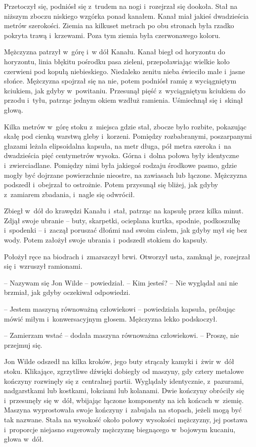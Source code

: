 \documentclass[oneside,polish,11pt,sfheadings]{mwbk}
\begin{document}
Przetoczył się, podniósł się z~trudem na nogi i~rozejrzał się dookoła.
Stał na niższym zboczu niskiego wzgórka ponad kanałem. Kanał miał jakieś
dwadzieścia metrów szerokości. Ziemia na kilkuset metrach po obu
stronach była rzadko pokryta trawą i~krzewami. Poza tym ziemia była
czerwonawego koloru.

Mężczyzna patrzył w~górę i~w dół Kanału. Kanał biegł od horyzontu do
horyzontu, linia błękitu pośrodku pasa zieleni, przepoławiając wielkie
koło czerwieni pod kopułą niebieskiego. Niedaleko zenitu nieba świeciło
małe i~jasne słońce. Mężczyzna spojrzał się na nie, potem podniósł ramię
z wyciągniętym kciukiem, jak gdyby w~powitaniu. Przesunął pięść z~wyciągniętym kciukiem do przodu i~tyłu, patrząc jednym okiem wzdłuż
ramienia. Uśmiechnął się i~skinął głową.

Kilka metrów w~górę stoku z~miejsca gdzie stał, zbocze było rozbite,
pokazując skałę pod cienką warstwą gleby i~korzeni. Pomiędzy
rozbabranymi, poszarpanymi głazami leżała elipsoidalna kapsuła, na metr
długa, pół metra szeroka i~na dwadzieścia pięć centymetrów wysoka. Górna
i~dolna połowa były identyczne i~zwierciadlane. Pomiędzy nimi była
jakiegoś rodzaju środkowe pasmo, gdzie mogły być dojrzane powierzchnie
nieostre, na zawiasach lub łączone. Mężczyzna podszedł i~obejrzał to
ostrożnie. Potem przysunął się bliżej, jak gdyby z~zamiarem zbadania, i~nagle się odwrócił.

Zbiegł w~dół do krawędzi Kanału i~stał, patrząc na kapsułę przez kilka
minut. Zdjął swoje ubranie -- buty, skarpetki, ocieplana kurtka, spodnie,
podkoszulkę i~spodenki -- i~zaczął poruszać dłońmi nad swoim ciałem, jak
gdyby mył się bez wody. Potem założył swoje ubrania i~podszedł stokiem
do kapsuły.

Położył ręce na biodrach i~zmarszczył brwi. Otworzył usta, zamknął je,
rozejrzał się i~wzruszył ramionami.

-- Nazywam się Jon Wilde -- powiedział. -- Kim jesteś? -- Nie wyglądał ani
nie brzmiał, jak gdyby oczekiwał odpowiedzi.

-- Jestem maszyną równoważną człowiekowi -- powiedziała kapsuła, próbując
mówić miłym i~konwersacyjnym głosem. Mężczyzna lekko podskoczył.

-- Zamierzam wstać -- dodała maszyna równoważna człowiekowi. -- Proszę, nie
przejmuj się.

Jon Wilde odszedł na kilka kroków, jego buty strącały kamyki i~żwir w~dół stoku. Klikające, zgrzytliwe dźwięki dobiegły od maszyny, gdy cztery
metalowe kończyny rozwinęły się z~centralnej partii. Wyglądały
identycznie, z~pazurami, nadgarstkami lub kostkami, łokciami lub
kolanami. Dwie kończyny obróciły się i~przesunęły się w~dół, wbijając
łączone komponenty na ich końcach w~ziemię. Maszyna wyprostowała swoje
kończyny i~zabujała na stopach, jeżeli mogą być tak nazwane. Stała na
wysokość około połowy wysokości mężczyzny, jej postawa i~proporcje
niejasno sugerowały mężczyznę biegnącego w~bojowym kucaniu, głowa w~dół.
\end{document}
